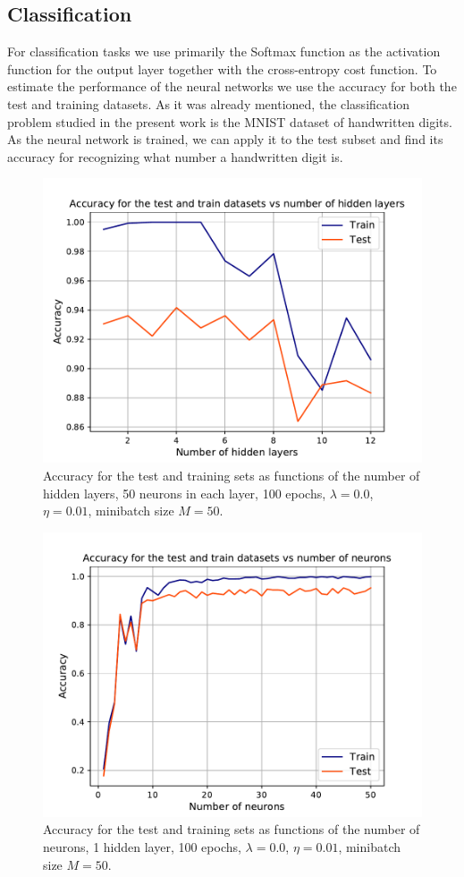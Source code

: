 \documentclass{emulateapj}
\begin{document}
\subsection{Classification}
\label{sec:classification}

For classification tasks we use primarily the Softmax function as the activation function for the output layer together with the cross-entropy cost function. To estimate the performance of the neural networks we use the accuracy for both the test and training datasets. As it was already mentioned, the classification problem studied in the present work is the MNIST dataset of handwritten digits. As the neural network is trained, we can apply it to the test subset and find its accuracy for recognizing what number a handwritten digit is. 

\begin{figure}[h!]
    \centering
    \includegraphics[width=.49\textwidth]{Figures/Class_hidden_layers.pdf}
    \caption{Accuracy for the test and training sets as functions of the number of hidden layers, 50 neurons in each layer, 100 epochs, $\lambda=0.0$, $\eta=0.01$, minibatch size $M=50$.}
    \label{fig:accuracy vs hidden layers}
\end{figure}

\begin{figure}[h!]
    \centering
    \includegraphics[width=.49\textwidth]{Figures/Class_hidden_neurons.pdf}
    \caption{Accuracy for the test and training sets as functions of the number of neurons, 1 hidden layer, 100 epochs, $\lambda=0.0$, $\eta=0.01$, minibatch size $M=50$.}
    \label{fig:accuracy vs num neurons}
\end{figure}
\end{document}
